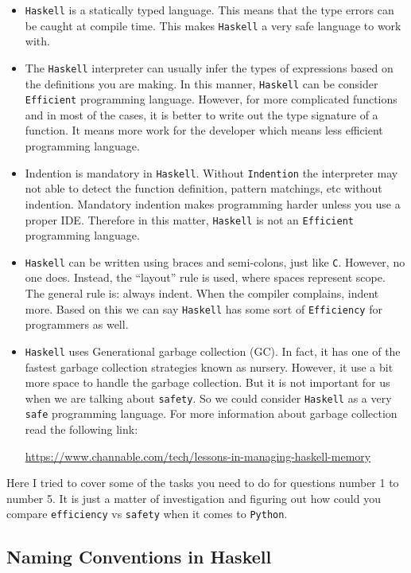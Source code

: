 \documentclass[11pt]{article}
\begin{document}
\begin{itemize}
\item \texttt{Haskell} is a statically typed language. This means that the type errors
can be caught at compile time. This makes \texttt{Haskell} a very safe language to
work with.
\item The \texttt{Haskell} interpreter can usually infer the types of expressions based
on the definitions you are making. In this manner, \texttt{Haskell} can be
consider \texttt{Efficient} programming language. However, for more
complicated functions and in most of the cases, it is better to write out
the type signature of a function. It means more work for the developer
which means less efficient programming language.
\item Indention is mandatory in \texttt{Haskell}. Without \texttt{Indention} the interpreter
may not able to detect the function definition, pattern matchings, etc
without indention. Mandatory indention makes programming harder unless you
use a proper IDE. Therefore in this matter, \texttt{Haskell} is not an \texttt{Efficient}
programming language.
\item \texttt{Haskell} can be written using braces and semi-colons, just like \texttt{C}.
However, no one does. Instead, the “layout” rule is used, where spaces
represent scope. The general rule is: always indent. When the compiler
complains, indent more. Based on this we can say \texttt{Haskell} has some sort of
\texttt{Efficiency} for programmers as well.
\item \texttt{Haskell} uses Generational garbage collection (GC). In fact, it has
one of the fastest garbage collection strategies known as nursery. However,
it use a bit more space to handle the garbage collection. But it is not
important for us when we are talking about \texttt{safety}. So we could consider
\texttt{Haskell} as a very \texttt{safe} programming language. For more information about
garbage collection read the following link:

\url{https://www.channable.com/tech/lessons-in-managing-haskell-memory}
\end{itemize}

Here I tried to cover some of the tasks you need to do for questions number 1 to
number 5. It is just a matter of investigation and figuring out how could you
compare \texttt{efficiency} vs \texttt{safety} when it comes to \texttt{Python}.

\subsection{Naming Conventions in Haskell}
\label{sec:org118f6fe}
\end{document}
